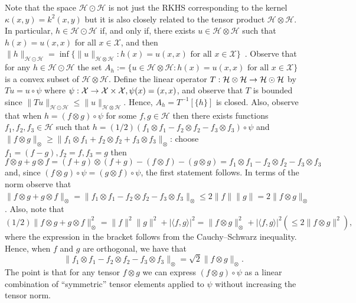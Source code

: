\documentclass[10pt]{amsart}
\theoremstyle{definition}\newtheorem{defi}[theo]{Definition}\newtheorem{rema}[theo]{Remark}\newtheorem{exam}[theo]{Example}\newtheorem{exem}[theo]{Example}\newtheorem{nota}[theo]{Notation}
\theoremstyle{remark}
\newcommand{\X}{\mathcal{X}}
\newcommand{\cH}{\mathcal{H}}
\renewcommand*{\to}{\mathchoice{\longrightarrow}{\rightarrow}{\rightarrow}{\rightarrow}}
\begin{document}
Note that the space $\cH \odot \cH$ is not just the RKHS corresponding to the kernel $\kappa(x,y) = k^2(x,y)$ but it is also closely related to the tensor product $\cH \otimes \cH$. In particular, $ h \in \cH \odot \cH$ if, and only if, there exists $u\in \cH \otimes \cH$ such that $h(x) = u(x,x)$ for all $x \in \X$, and then $\|h\|_{\cH \odot \cH} = \inf\{\|u\|_{\cH \otimes \cH} : h(x) = u(x,x) \text{ for all } x\in \X \}$~\cite[Theorem~5.16]{PAUL16}. Observe that for any $h \in \cH \odot \cH$ the set $A_h:= \{u \in \cH \otimes \cH : h(x) = u(x,x) \text{ for all } x\in \X \}$ is a convex subset of $\cH \otimes \cH$. Define the linear operator $T: \cH \otimes \cH \to \cH \odot \cH$ by $T u = u \circ \psi$ where $\psi: \X \to \X \times \X, \psi(x) = (x,x)$, and observe that $T$ is bounded since $\|Tu\|_{\cH \odot \cH} \leq \|u\|_{\cH \otimes \cH}$. Hence, $A_h = T^{-1}[\{h\}]$ is closed. Also, observe that when $h = (f\otimes g) \circ \psi$ for some $f,g \in \cH$ then there exists functions $f_1,f_2,f_3 \in \cH$ such that $h = (1/2) (f_1 \otimes f_1 - f_2 \otimes f_2 - f_3 \otimes f_3) \circ \psi$ and $\|f \otimes g\|_\otimes \geq \|f_1 \otimes f_1 + f_2 \otimes f_2 + f_3 \otimes f_3 \|_\otimes$: choose $f_1 = (f- g), f_2 = f, f_3 = g$ then
\[
f \otimes g + g \otimes f = (f+g) \otimes (f+g) - (f \otimes f) - (g \otimes g) = f_1 \otimes f_1 - f_2 \otimes f_2 - f_3 \otimes f_3
\]
and, since $(f \otimes g) \circ \psi = (g \otimes f) \circ \psi$, the first statement follows. In terms of the norm observe that $\| f \otimes g + g\otimes f\|_\otimes = \| f_1 \otimes f_1 - f_2 \otimes f_2 - f_3 \otimes f_3\|_\otimes \leq 2\|f\|\|g\| = 2 \|f\otimes g\|_\otimes$. Also, note that
\[
(1/2)\| f \otimes g + g \otimes f\|_\otimes^2 = \|f\|^2 \|g\|^2 + |\langle f, g \rangle|^2 = \|f \otimes g\|_\otimes^2 + |\langle f, g \rangle|^2 (\leq 2 \|f \otimes g\|^2),
\]
where the expression in the bracket follows from the Cauchy--Schwarz inequality. Hence, when $f$ and $g$ are orthogonal, we have that
\[
\| f_1 \otimes f_1 - f_2 \otimes f_2 - f_3 \otimes f_3\|_\otimes = \sqrt{2} \|f \otimes g\|_\otimes.
\]
The point is that for any tensor $f \otimes g$ we can express $(f \otimes g) \circ \psi$ as a linear combination of ``symmetric'' tensor elements applied to $\psi$ without increasing the tensor norm.
\end{document}
